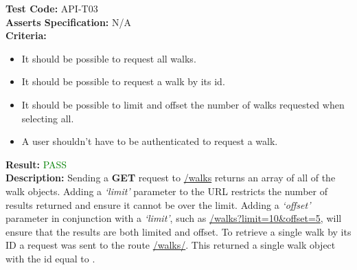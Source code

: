 \documentclass[11pt,a4paper]{report}
\begin{document}
\label{test:API-T03}
\noindent\textbf{Test Code:} API-T03\\
\textbf{Asserts Specification:} N/A \\ 
\textbf{Criteria:} \begin{itemize}
                     \item It should be possible to request all walks.
                     \item It should be possible to request a walk by its id.
                     \item It should be possible to limit and offset the number of walks requested when selecting all.
                     \item A user shouldn't have to be authenticated to request a walk.
                   \end{itemize}  
\textbf{Result:} \textcolor{green}{PASS}\\ 
\textbf{Description:} Sending a \textbf{GET} request to \url{/walks} returns an array of all of the walk objects. Adding a \textit{`limit'} parameter to the URL restricts the number of results returned and ensure it cannot be over the limit. Adding a \textit{`offset'} parameter in conjunction with a \textit{`limit'}, such as \url{/walks?limit=10&offset=5}, will ensure that the results are both limited and offset. To retrieve a single walk by its ID a request was sent to the route \url{/walks/}. This returned a single walk object with the id equal to . \\ 
\end{document}
